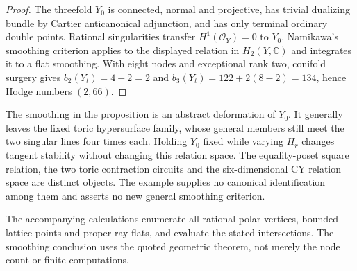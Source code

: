 \documentclass[11pt]{amsart}
\theoremstyle{definition}
\theoremstyle{remark}
\newcommand{\CC}{\mathbb C}
\newcommand{\cO}{\mathcal O}
\begin{document}
\begin{proof}
The threefold $Y_0$ is connected, normal and projective, has trivial
dualizing bundle by Cartier anticanonical adjunction, and has only
terminal ordinary double points. Rational singularities transfer
$H^1(\cO_Y)=0$ to $Y_0$. Namikawa's smoothing criterion
\cite[Theorem~2.5]{namikawa2002} applies to the displayed relation
in $H_2(Y,\CC)$ and integrates it to a flat smoothing. With eight
nodes and exceptional rank two, conifold surgery gives
$b_2(Y_t)=4-2=2$ and $b_3(Y_t)=122+2(8-2)=134$, hence Hodge
numbers $(2,66)$.
\end{proof}

The smoothing in the proposition is an abstract deformation of $Y_0$.
It generally leaves the fixed toric hypersurface family, whose general
members still meet the two singular lines four times each. Holding
$Y_0$ fixed while varying $H_r$ changes tangent stability without
changing this relation space. The equality-poset square relation, the
two toric contraction circuits and the six-dimensional CY relation
space are distinct objects. The example supplies no canonical
identification among them and asserts no new general smoothing criterion.

The accompanying calculations enumerate all rational polar vertices,
bounded lattice points and proper ray flats, and evaluate the stated
intersections. The smoothing conclusion uses the quoted geometric
theorem, not merely the node count or finite computations.
\end{document}
